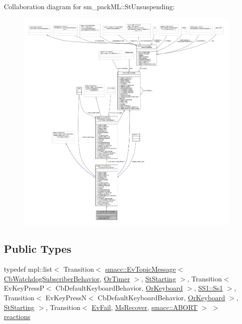 Collaboration diagram for sm\+\_\+pack\+ML\+:\+:St\+Unsuspending\+:
\nopagebreak
\begin{figure}[H]
\begin{center}
\leavevmode
\includegraphics[width=350pt]{structsm__packML_1_1StUnsuspending__coll__graph}
\end{center}
\end{figure}
\subsection*{Public Types}
\begin{DoxyCompactItemize}
\item 
typedef mpl\+::list$<$ Transition$<$ \hyperlink{structsmacc_1_1default__events_1_1EvTopicMessage}{smacc\+::\+Ev\+Topic\+Message}$<$ \hyperlink{classsm__packML_1_1cl__subscriber_1_1CbWatchdogSubscriberBehavior}{Cb\+Watchdog\+Subscriber\+Behavior}, \hyperlink{classsm__packML_1_1OrTimer}{Or\+Timer} $>$, \hyperlink{structsm__packML_1_1StStarting}{St\+Starting} $>$, Transition$<$ Ev\+Key\+PressP$<$ Cb\+Default\+Keyboard\+Behavior, \hyperlink{classsm__packML_1_1OrKeyboard}{Or\+Keyboard} $>$, \hyperlink{structsm__packML_1_1SS1_1_1Ss1}{S\+S1\+::\+Ss1} $>$, Transition$<$ Ev\+Key\+PressN$<$ Cb\+Default\+Keyboard\+Behavior, \hyperlink{classsm__packML_1_1OrKeyboard}{Or\+Keyboard} $>$, \hyperlink{structsm__packML_1_1StStarting}{St\+Starting} $>$, Transition$<$ \hyperlink{structsm__packML_1_1EvFail}{Ev\+Fail}, \hyperlink{classsm__packML_1_1MsRecover}{Ms\+Recover}, \hyperlink{structsmacc_1_1default__transition__tags_1_1ABORT}{smacc\+::\+A\+B\+O\+RT} $>$ $>$ \hyperlink{structsm__packML_1_1StUnsuspending_a11837ff479a94ef761b8c42f5ebb8f7d}{reactions}
\end{DoxyCompactItemize}
